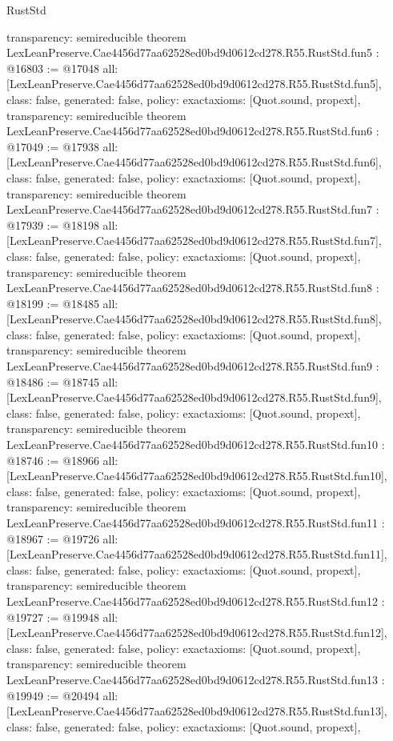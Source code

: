 \begin{lexlean}{RustStd}
\begin{coremodule}
{  transparency: semireducible
}
theorem LexLeanPreserve.Cae4456d77aa62528ed0bd9d0612cd278.R55.RustStd.fun5 : @16803 := @17048 {
  all: [LexLeanPreserve.Cae4456d77aa62528ed0bd9d0612cd278.R55.RustStd.fun5],
  class: false,
  generated: false,
  policy: exact{axioms: [Quot.sound, propext]},
  transparency: semireducible
}
theorem LexLeanPreserve.Cae4456d77aa62528ed0bd9d0612cd278.R55.RustStd.fun6 : @17049 := @17938 {
  all: [LexLeanPreserve.Cae4456d77aa62528ed0bd9d0612cd278.R55.RustStd.fun6],
  class: false,
  generated: false,
  policy: exact{axioms: [Quot.sound, propext]},
  transparency: semireducible
}
theorem LexLeanPreserve.Cae4456d77aa62528ed0bd9d0612cd278.R55.RustStd.fun7 : @17939 := @18198 {
  all: [LexLeanPreserve.Cae4456d77aa62528ed0bd9d0612cd278.R55.RustStd.fun7],
  class: false,
  generated: false,
  policy: exact{axioms: [Quot.sound, propext]},
  transparency: semireducible
}
theorem LexLeanPreserve.Cae4456d77aa62528ed0bd9d0612cd278.R55.RustStd.fun8 : @18199 := @18485 {
  all: [LexLeanPreserve.Cae4456d77aa62528ed0bd9d0612cd278.R55.RustStd.fun8],
  class: false,
  generated: false,
  policy: exact{axioms: [Quot.sound, propext]},
  transparency: semireducible
}
theorem LexLeanPreserve.Cae4456d77aa62528ed0bd9d0612cd278.R55.RustStd.fun9 : @18486 := @18745 {
  all: [LexLeanPreserve.Cae4456d77aa62528ed0bd9d0612cd278.R55.RustStd.fun9],
  class: false,
  generated: false,
  policy: exact{axioms: [Quot.sound, propext]},
  transparency: semireducible
}
theorem LexLeanPreserve.Cae4456d77aa62528ed0bd9d0612cd278.R55.RustStd.fun10 : @18746 := @18966 {
  all: [LexLeanPreserve.Cae4456d77aa62528ed0bd9d0612cd278.R55.RustStd.fun10],
  class: false,
  generated: false,
  policy: exact{axioms: [Quot.sound, propext]},
  transparency: semireducible
}
theorem LexLeanPreserve.Cae4456d77aa62528ed0bd9d0612cd278.R55.RustStd.fun11 : @18967 := @19726 {
  all: [LexLeanPreserve.Cae4456d77aa62528ed0bd9d0612cd278.R55.RustStd.fun11],
  class: false,
  generated: false,
  policy: exact{axioms: [Quot.sound, propext]},
  transparency: semireducible
}
theorem LexLeanPreserve.Cae4456d77aa62528ed0bd9d0612cd278.R55.RustStd.fun12 : @19727 := @19948 {
  all: [LexLeanPreserve.Cae4456d77aa62528ed0bd9d0612cd278.R55.RustStd.fun12],
  class: false,
  generated: false,
  policy: exact{axioms: [Quot.sound, propext]},
  transparency: semireducible
}
theorem LexLeanPreserve.Cae4456d77aa62528ed0bd9d0612cd278.R55.RustStd.fun13 : @19949 := @20494 {
  all: [LexLeanPreserve.Cae4456d77aa62528ed0bd9d0612cd278.R55.RustStd.fun13],
  class: false,
  generated: false,
  policy: exact{axioms: [Quot.sound, propext]},
}
\end{coremodule}
\end{lexlean}
